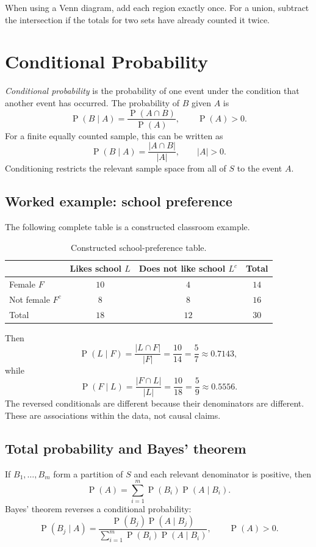 \documentclass[11pt]{article}
\newcommand{\Pp}{\operatorname{P}}
\begin{document}
\begin{keybox}
When using a Venn diagram, add each region exactly once.  For a union, subtract
the intersection if the totals for two sets have already counted it twice.
\end{keybox}

\section{Conditional Probability}\label{sec:conditional}
\emph{Conditional probability} is the probability of one event under the
condition that another event has occurred.  The probability of $B$ given $A$ is
\[
\Pp(B\mid A)=\frac{\Pp(A\cap B)}{\Pp(A)},\qquad \Pp(A)>0.
\]
For a finite equally counted sample, this can be written as
\[
\Pp(B\mid A)=\frac{|A\cap B|}{|A|},\qquad |A|>0.
\]
Conditioning restricts the relevant sample space from all of $S$ to the event
$A$.

\subsection{Worked example: school preference}
The following complete table is a constructed classroom example.
\begin{table}[ht]
\centering
\caption{Constructed school-preference table.}\label{tab:school}
\begin{tabular}{@{}lccc@{}}
\toprule
 & Likes school $L$ & Does not like school $L^c$ & Total \\
\midrule
Female $F$ & $10$ & $4$ & $14$ \\
Not female $F^c$ & $8$ & $8$ & $16$ \\
\midrule
Total & $18$ & $12$ & $30$ \\
\bottomrule
\end{tabular}
\end{table}

Then
\[
\Pp(L\mid F)=\frac{|L\cap F|}{|F|}=\frac{10}{14}=\frac{5}{7}\approx0.7143,
\]
while
\[
\Pp(F\mid L)=\frac{|F\cap L|}{|L|}=\frac{10}{18}=\frac{5}{9}\approx0.5556.
\]
The reversed conditionals are different because their denominators are
different.  These are associations within the data, not causal claims.

\subsection{Total probability and Bayes' theorem}
If $B_1,\ldots,B_m$ form a partition of $S$ and each relevant denominator is
positive, then
\[
\Pp(A)=\sum_{i=1}^{m}\Pp(B_i)\Pp(A\mid B_i).
\]
Bayes' theorem reverses a conditional probability:
\[
\Pp(B_j\mid A)=
\frac{\Pp(B_j)\Pp(A\mid B_j)}
{\sum_{i=1}^{m}\Pp(B_i)\Pp(A\mid B_i)},\qquad \Pp(A)>0.
\]
\end{document}
